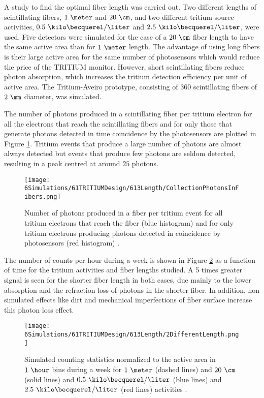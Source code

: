 A study to find the optimal fiber length was carried out. Two different lengths of scintillating fibers, $1~\meter$ and $20~\cm$, and two different tritium source activities, $0.5~\kilo\becquerel/\liter$ and $2.5~\kilo\becquerel/\liter$, were used. Five detectors were simulated for the case of a $20~\cm$ fiber length to have the same active area than for $1~\meter$ length. The advantage of using long fibers is their large active area for the same number of photosensors which would reduce the price of the TRITIUM monitor. However, short scintillating fibers reduce photon absorption, which increases the tritium detection efficiency per unit of active area. The Tritium-Aveiro prototype, consisting of $360$ scintillating fibers of $2~\mm$ diameter, was simulated. 

The number of photons produced in a scintillating fiber per tritium electron for all the electrons that reach the scintillating fibers and for only those that generate photons detected in time coincidence by the photosensors are plotted in Figure \ref{fig:PhotonsFibersYesNoPhotosensors}. Tritium events that produce a large number of photons are almost always detected but events that produce few photons are seldom detected, resulting in a peak centred at around $25$ photons.  

\begin{figure}[h]
\centering
\texttt{[image: 6Simulations/61TRITIUMDesign/613Length/CollectionPhotonsInFibers.png]}
\caption{Number of photons produced in a fiber per tritium event for all tritium electrons that reach the fiber (blue histogram) and for only tritium electrons producing photons detected in coincidence by photosensors (red histogram) \cite{SimulationPaperCarlos}.\label{fig:PhotonsFibersYesNoPhotosensors}}
\end{figure}


The number of counts per hour during a week is shown in Figure \ref{fig:CountsOver60minDifferentLength} as a function of time for the tritium activities and fiber lengths studied. A 5 times greater signal is seen for the shorter fiber length in both cases, due mainly to the lower absorption and the refraction loss of photons in the shorter fiber. In addition, non simulated effects like dirt and mechanical imperfections of fiber surface increase this photon loss effect.

\begin{figure}[h]
\centering
\texttt{[image: 6Simulations/61TRITIUMDesign/613Length/2DifferentLength.png]}
\caption{Simulated counting statistics normalized to the active area in $1~\hour$ bins during a week for $1~\meter$ (dashed lines) and $20~\cm$ (solid lines) and $0.5~\kilo\becquerel/\liter$ (blue lines) and $2.5~\kilo\becquerel/\liter$ (red lines) activities \cite{SimulationPaperCarlos}. \label{fig:CountsOver60minDifferentLength}}
\end{figure}

